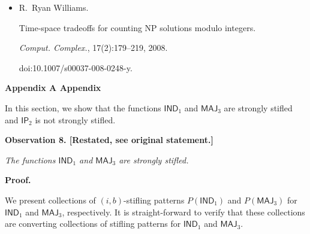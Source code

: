 \begin{itemize}
doi:10.1007/978-3-319-58747-9\_26.





\item[] 
[26]

R. Ryan Williams.


Time-space tradeoffs for counting NP solutions modulo integers.


\emph{Comput. Complex.}, 17(2):179–219, 2008.


doi:10.1007/s00037-008-0248-y.





\end{itemize}




\par\medskip\noindent\textbf{
Appendix A Appendix}\par




In this section, we show that the functions $\mathsf{IND}_{1}$ and $\mathsf{MAJ}_{3}$ are strongly stifled and $\mathsf{IP}_{2}$ is not strongly stifled.\par






\par\medskip\noindent\textbf{
\textbf{Observation 8}\textbf{.}
[Restated, see original statement.]}\par



\emph{The functions $\mathsf{IND}_{1}$ and $\mathsf{MAJ}_{3}$ are strongly stifled.}\par







\par\medskip\noindent\textbf{Proof.}\par




We present collections of $(i,b)$-stifling patterns $P(\mathsf{IND}_{1})$ and $P(\mathsf{MAJ}_{3})$ for $\mathsf{IND}_{1}$ and $\mathsf{MAJ}_{3}$, respectively.
It is straight-forward to verify that these collections are converting collections of stifling patterns for $\mathsf{IND}_{1}$ and $\mathsf{MAJ}_{3}$.\par






